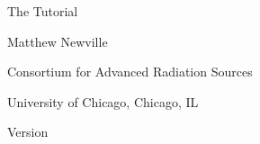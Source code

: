 
\begin{flushright}\vspace*{0.375in}
\vspace{10mm}{\ThickGreyLine}  \vspace{5mm}
{\Huge{The {\ifeffit} Tutorial}}
\vspace{100mm} {\ }

\thispagestyle{empty}
\setcounter{page}{0} 

{\Large Matthew Newville}\par
Consortium for Advanced Radiation Sources\par
University of Chicago, Chicago, IL\par

\thispagestyle{empty}  \vspace{5mm} {\ThickGreyLine}

{Version {\Vers}}\par
{\update}\par
\end{flushright}




